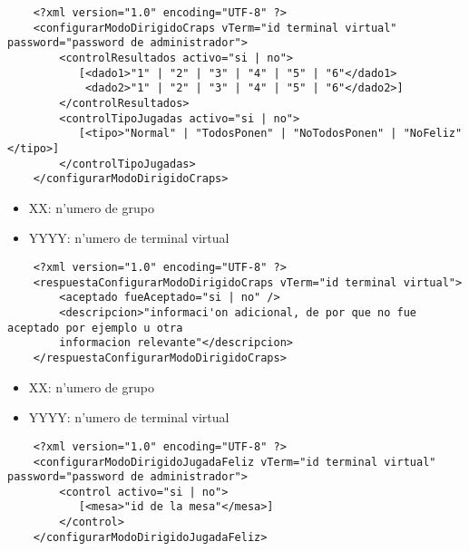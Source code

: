 \begin{verbatim}
    <?xml version="1.0" encoding="UTF-8" ?>
    <configurarModoDirigidoCraps vTerm="id terminal virtual" password="password de administrador">
        <controlResultados activo="si | no">
           [<dado1>"1" | "2" | "3" | "4" | "5" | "6"</dado1>
            <dado2>"1" | "2" | "3" | "4" | "5" | "6"</dado2>]
        </controlResultados>
        <controlTipoJugadas activo="si | no">
           [<tipo>"Normal" | "TodosPonen" | "NoTodosPonen" | "NoFeliz"</tipo>]
        </controlTipoJugadas>
    </configurarModoDirigidoCraps>
\end{verbatim}


 
\begin{itemize}
    \item{XX: n'umero de grupo}
    \item{YYYY: n'umero de terminal virtual}
\end{itemize}

\begin{verbatim}
    <?xml version="1.0" encoding="UTF-8" ?>
    <respuestaConfigurarModoDirigidoCraps vTerm="id terminal virtual">
        <aceptado fueAceptado="si | no" />
        <descripcion>"informaci'on adicional, de por que no fue aceptado por ejemplo u otra
        informacion relevante"</descripcion>
    </respuestaConfigurarModoDirigidoCraps>
\end{verbatim}


 
\begin{itemize}
    \item{XX: n'umero de grupo}
    \item{YYYY: n'umero de terminal virtual}
\end{itemize}


\begin{verbatim}
    <?xml version="1.0" encoding="UTF-8" ?>
    <configurarModoDirigidoJugadaFeliz vTerm="id terminal virtual" password="password de administrador">
        <control activo="si | no">
           [<mesa>"id de la mesa"</mesa>]
        </control>
    </configurarModoDirigidoJugadaFeliz>
\end{verbatim}


